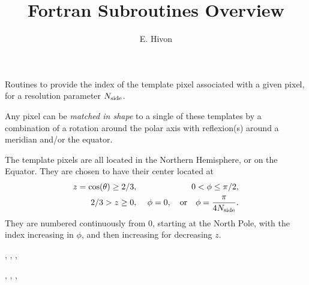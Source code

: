
\sloppy


\title{\healpix Fortran Subroutines Overview}
\section[template\_pixel\_nest, template\_pixel\_ring]{ }
\label{sub:template_pixel_xxx}
\author{E. Hivon}

\begin{facility}
{Routines to provide the index of the template pixel associated with a given
  \healpix pixel, for a resolution parameter ${N_{\rm side}}$. 

Any pixel can be {\em matched in shape}
  to a single of these templates by a combination of  a rotation around the polar axis with 
  reflexion(s) around a meridian and/or the equator. 

The template pixels are all located in the Northern Hemisphere, or on the
 Equator.
They are chosen to have their center located at
\begin{eqnarray}
	\label{eq:template_pixel_xxx}
     z=\cos(\theta)\ge 2/3,  &\ &    0< \phi \leq \pi/2,   \nonumber\\            %
     2/3 > z \geq 0,  &\ & \phi=0, \quad{\rm or}\quad  \phi=\frac{\pi}{4\nside}.  %
\myhtmlimage{}
\end{eqnarray}
 They are numbered continuously from 0, starting at the North Pole, with the index
 increasing in $\phi$, and then increasing for decreasing $z$.
}
{\modPixTools}
\end{facility}

\begin{f90format}
{%
, 
, 
, 
%
}
\end{f90format}
\begin{f90format}
{%
, 
, 
, 
%
}
\end{f90format}

